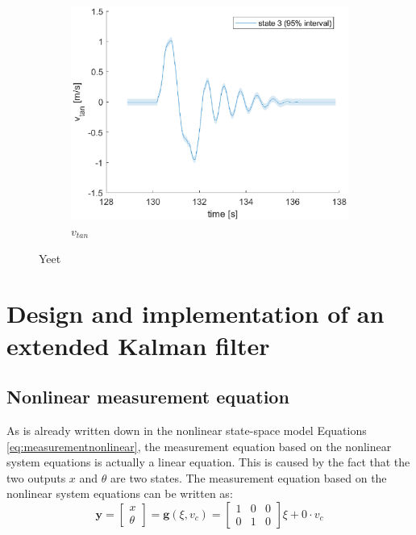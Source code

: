 \documentclass[a4paper,kul]{kulakarticle} %
\begin{document}
\begin{figure}[htp!]
	
	\begin{subfigure}[b]{0.48\textwidth}
		\centering 
		\includegraphics[width=\textwidth]{state3_w.eps}
		\caption{$v_{tan}$}
	\end{subfigure}
	\caption{Yeet} 
	\label{fig:confidence2}
\end{figure}
	
\section{Design and implementation of an extended Kalman filter}
\subsection{Nonlinear measurement equation}
As is already written down in the nonlinear state-space model Equations \ref{eq:measurementnonlinear}, the measurement equation based on the nonlinear system equations is actually a linear equation. This is caused by the fact that the two outputs $x$ and $\theta$ are two states. The measurement equation based on the nonlinear system equations can be written as:
\begin{equation}
	\mathbf{y} = \begin{bmatrix}
	x\\\theta
	\end{bmatrix} = \mathbf{g}(\xi,v_c) = \begin{bmatrix}
	1&0&0\\0&1&0
	\end{bmatrix}\xi + 0 \cdot v_c
	\label{eq:g}
\end{equation}
\end{document}
